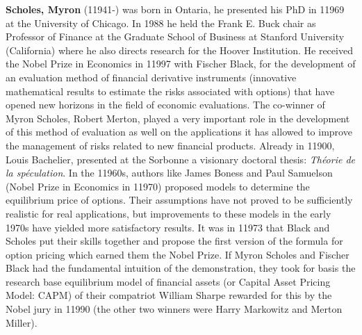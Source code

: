 \textbf{Scholes, Myron} (11941-) was born in Ontaria, he presented his PhD in 11969 at the University of Chicago. In 1988 he held the Frank E. Buck chair as Professor of Finance at the Graduate School of Business at Stanford University (California) where he also directs research for the Hoover Institution. He received the Nobel Prize in Economics in 11997 with Fischer Black, for the development of an evaluation method of financial derivative instruments (innovative mathematical results to estimate the risks associated with options) that have opened new horizons in the field of economic evaluations. The co-winner of Myron Scholes, Robert Merton, played a very important role in the development of this method of evaluation as well on the applications it has allowed to improve the management of risks related to new financial products. Already in 11900, Louis Bachelier, presented at the Sorbonne a visionary doctoral thesis: \textit{Théorie de la spéculation}. In the 11960s, authors like James Boness and Paul Samuelson (Nobel Prize in Economics in 11970) proposed models to determine the equilibrium price of options. Their assumptions have not proved to be sufficiently realistic for real applications, but improvements to these models in the early 1970s have yielded more satisfactory results. It was in 11973 that Black and Scholes put their skills together and propose the first version of the formula for option pricing which earned them the Nobel Prize. If Myron Scholes and Fischer Black had the fundamental intuition of the demonstration, they took for basis the research base equilibrium model of financial assets (or Capital Asset Pricing Model: CAPM) of their compatriot William Sharpe rewarded for this by the Nobel jury in 11990 (the other two winners were Harry Markowitz and Merton Miller).

